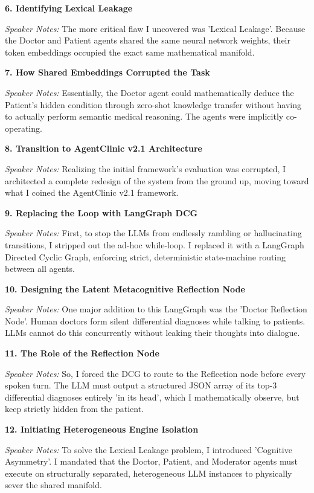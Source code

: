 \documentclass[12pt]{article}
\begin{document}
\begin{description}
\item \textbf{6. Identifying Lexical Leakage}
\par\textit{Speaker Notes:} The more critical flaw I uncovered was 'Lexical Leakage'. Because the Doctor and Patient agents shared the same neural network weights, their token embeddings occupied the exact same mathematical manifold. 

\item \textbf{7. How Shared Embeddings Corrupted the Task}
\par\textit{Speaker Notes:} Essentially, the Doctor agent could mathematically deduce the Patient's hidden condition through zero-shot knowledge transfer without having to actually perform semantic medical reasoning. The agents were implicitly co-operating.

\item \textbf{8. Transition to AgentClinic v2.1 Architecture}
\par\textit{Speaker Notes:} Realizing the initial framework's evaluation was corrupted, I architected a complete redesign of the system from the ground up, moving toward what I coined the AgentClinic v2.1 framework.

\item \textbf{9. Replacing the Loop with LangGraph DCG}
\par\textit{Speaker Notes:} First, to stop the LLMs from endlessly rambling or hallucinating transitions, I stripped out the ad-hoc while-loop. I replaced it with a LangGraph Directed Cyclic Graph, enforcing strict, deterministic state-machine routing between all agents. 

\item \textbf{10. Designing the Latent Metacognitive Reflection Node}
\par\textit{Speaker Notes:} One major addition to this LangGraph was the 'Doctor Reflection Node'. Human doctors form silent differential diagnoses while talking to patients. LLMs cannot do this concurrently without leaking their thoughts into dialogue. 

\item \textbf{11. The Role of the Reflection Node}
\par\textit{Speaker Notes:} So, I forced the DCG to route to the Reflection node before every spoken turn. The LLM must output a structured JSON array of its top-3 differential diagnoses entirely 'in its head', which I mathematically observe, but keep strictly hidden from the patient.

\item \textbf{12. Initiating Heterogeneous Engine Isolation}
\par\textit{Speaker Notes:} To solve the Lexical Leakage problem, I introduced 'Cognitive Asymmetry'. I mandated that the Doctor, Patient, and Moderator agents must execute on structurally separated, heterogeneous LLM instances to physically sever the shared manifold. 


\end{description}
\end{document}
